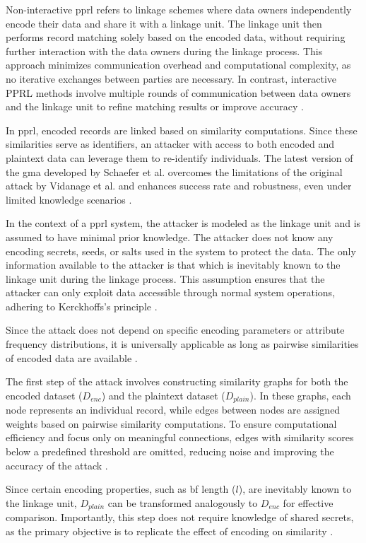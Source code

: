 Non-interactive \ac{pprl} refers to linkage schemes where data owners independently encode their data and share it with a linkage unit.
The linkage unit then performs record matching solely based on the encoded data, without requiring further interaction with the data owners during the linkage process.
This approach minimizes communication overhead and computational complexity, as no iterative exchanges between parties are necessary.
In contrast, interactive PPRL methods involve multiple rounds of communication between data owners and the linkage unit to refine matching results or improve accuracy \cite{kum2014privacy}.

In \ac{pprl}, encoded records are linked based on similarity computations.
Since these similarities serve as identifiers, an attacker with access to both encoded and plaintext data can leverage them to re-identify individuals.
The latest version of the \ac{gma} developed by Schaefer et al. overcomes the limitations of the original attack by Vidanage et al. and enhances success rate and robustness, even under limited knowledge scenarios \cite{schaefer2024}.

In the context of a \ac{pprl} system, the attacker is modeled as the linkage unit and is assumed to have minimal prior knowledge.
The attacker does not know any encoding secrets, seeds, or salts used in the system to protect the data.
The only information available to the attacker is that which is inevitably known to the linkage unit during the linkage process.
This assumption ensures that the attacker can only exploit data accessible through normal system operations, adhering to Kerckhoffs's principle \cite{schaefer2024}.

Since the attack does not depend on specific encoding parameters or attribute frequency distributions, it is universally applicable as long as pairwise similarities of encoded data are available \cite{schaefer2024}.

The first step of the attack involves constructing similarity graphs for both the encoded dataset (\(D_{enc}\)) and the plaintext dataset (\(D_{plain}\)).
In these graphs, each node represents an individual record, while edges between nodes are assigned weights based on pairwise similarity computations.
To ensure computational efficiency and focus only on meaningful connections, edges with similarity scores below a predefined threshold are omitted, reducing noise and improving the accuracy of the attack \cite{schaefer2024}.

Since certain encoding properties, such as \ac{bf} length ($l$), are inevitably known to the linkage unit, $D_{plain}$ can be transformed analogously to $D_{enc}$ for effective comparison.
Importantly, this step does not require knowledge of shared secrets, as the primary objective is to replicate the effect of encoding on similarity \cite{schaefer2024}.

